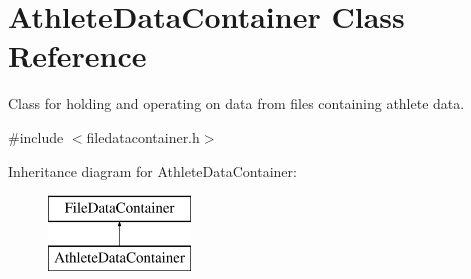 \hypertarget{classAthleteDataContainer}{}\section{Athlete\+Data\+Container Class Reference}
\label{classAthleteDataContainer}


Class for holding and operating on data from files containing athlete data.  




{\ttfamily \#include $<$filedatacontainer.\+h$>$}

Inheritance diagram for Athlete\+Data\+Container\+:\begin{figure}[H]
\begin{center}
\leavevmode
\includegraphics[height=2.000000cm]{classAthleteDataContainer}
\end{center}
\end{figure}
